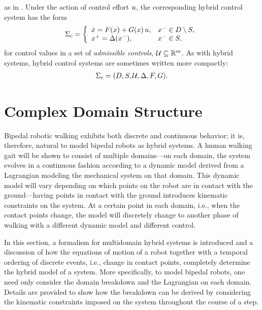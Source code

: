 as in \cite{Sinnet2009}.
%
Under the action of control effort $u$, the corresponding hybrid control
system has the form
%
\begin{align}
  \Sigma_{c} = \left\{
  \begin{array}{l l}
    {\dot {x}} = F(x) + G(x) \, u, & x^{-} \in D \setminus S,\\
    x^{+} = \Delta(x^{-}), & x^{-} \in S,
  \end{array}\right.
  \label{eq:hcsys}
\end{align}
%
for control values in a set of {\em admissible controls}, $\mathcal{U} \subseteq \mathbb{R}^{m}$.
%
As with hybrid systems, hybrid control systems are sometimes written more
compactly:
\begin{align*}
  \Sigma_{c} = (D, S, \mathcal{U}, \Delta, F, G).
\end{align*}


\section{Complex Domain Structure}
Bipedal robotic walking exhibits both discrete and continuous behavior; it is,
therefore, natural to model bipedal robots as hybrid systems.
%
A human walking gait will be shown to consist of multiple domains---on each
domain, the system evolves in a continuous fashion according to a dynamic model
derived from a Lagrangian modeling the mechanical system on that domain.
%
This dynamic model will vary depending on which points on the robot are in
contact with the ground---having points in contact with the ground introduces
kinematic constraints on the system.
%
At a certain point in each domain, i.e., when the contact points change, the
model will discretely change to another phase of walking with a different
dynamic model and different control.
%

In this section, a formalism for multidomain hybrid systems is introduced and a
discussion of how the equations of motion of a robot together with a temporal
ordering of discrete events, i.e., change in contact points, completely
determine the hybrid model of a system.
%
More specifically, to model bipedal robots, one need only consider the domain
breakdown and the Lagrangian on each domain.
%
Details are provided to show how the breakdown can be derived by considering the
kinematic constraints imposed on the system throughout the course of a step.


